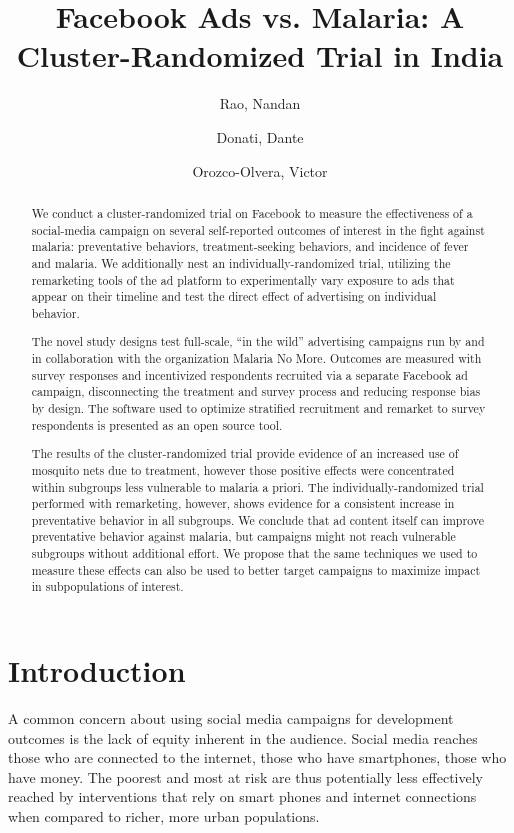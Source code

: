 \documentclass[a4paper,12pt]{article}
\author{
  Rao, Nandan\\
  \and
  Donati, Dante\\
  \and
  Orozco-Olvera, Victor
}
\title{Facebook Ads vs. Malaria: A Cluster-Randomized Trial in India}
\begin{document}
\maketitle

\begin{abstract}
We conduct a cluster-randomized trial on Facebook to measure the effectiveness of a social-media campaign on several self-reported outcomes of interest in the fight against malaria: preventative behaviors, treatment-seeking behaviors, and incidence of fever and malaria. We additionally nest an individually-randomized trial, utilizing the remarketing tools of the ad platform to experimentally vary exposure to ads that appear on their timeline and test the direct effect of advertising on individual behavior.

The novel study designs test full-scale, ``in the wild'' advertising campaigns run by and in collaboration with the organization Malaria No More. Outcomes are measured with survey responses and incentivized respondents recruited via a separate Facebook ad campaign, disconnecting the treatment and survey process and reducing response bias by design. The software used to optimize stratified recruitment and remarket to survey respondents is presented as an open source tool. 

The results of the cluster-randomized trial provide evidence of an increased use of mosquito nets due to treatment, however those positive effects were concentrated within subgroups less vulnerable to malaria a priori. The individually-randomized trial performed with remarketing, however, shows evidence for a consistent increase in preventative behavior in all subgroups. We conclude that ad content itself can improve preventative behavior against malaria, but campaigns might not reach vulnerable subgroups without additional effort. We propose that the same techniques we used to measure these effects can also be used to better target campaigns to maximize impact in subpopulations of interest. 


\end{abstract}

\clearpage

\section{Introduction}

A common concern about using social media campaigns for development outcomes is the lack of equity inherent in the audience. Social media reaches those who are connected to the internet, those who have smartphones, those who have money. The poorest and most at risk are thus potentially less effectively reached by interventions that rely on smart phones and internet connections when compared to richer, more urban populations.
\end{document}
